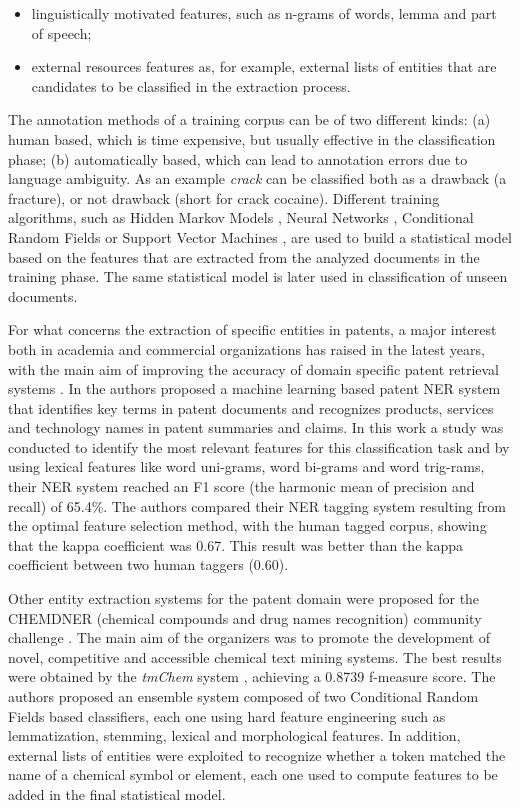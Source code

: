 \documentclass[]{book}
\providecommand{\tightlist}{%
  \setlength{\itemsep}{0pt}\setlength{\parskip}{0pt}}
\theoremstyle{definition}
\theoremstyle{definition}
\theoremstyle{definition}
\theoremstyle{remark}
\begin{document}
\begin{itemize}
\tightlist
\item
  linguistically motivated features, such as n-grams of words, lemma and
  part of speech;
\item
  external resources features as, for example, external lists of
  entities that are candidates to be classified in the extraction
  process.
\end{itemize}

The annotation methods of a training corpus can be of two different
kinds: (a) human based, which is time expensive, but usually effective
in the classification phase; (b) automatically based, which can lead to
annotation errors due to language ambiguity. As an example \emph{crack}
can be classified both as a drawback (a fracture), or not drawback
(short for crack cocaine). Different training algorithms, such as Hidden
Markov Models \citep{hmm}, Neural Networks \citep{nnet}, Conditional
Random Fields \citep{crf} or Support Vector Machines \citep{svm}, are
used to build a statistical model based on the features that are
extracted from the analyzed documents in the training phase. The same
statistical model is later used in classification of unseen documents.

For what concerns the extraction of specific entities in patents, a
major interest both in academia and commercial organizations has raised
in the latest years, with the main aim of improving the accuracy of
domain specific patent retrieval systems \citep{chemdner}. In
\citep{lee-ner13} the authors proposed a machine learning based patent
NER system that identifies key terms in patent documents and recognizes
products, services and technology names in patent summaries and claims.
In this work a study was conducted to identify the most relevant
features for this classification task and by using lexical features like
word uni-grams, word bi-grams and word trig-rams, their NER system
reached an F1 score (the harmonic mean of precision and recall) of
65.4\%. The authors compared their NER tagging system resulting from the
optimal feature selection method, with the human tagged corpus, showing
that the kappa coefficient was 0.67. This result was better than the
kappa coefficient between two human taggers (0.60).

Other entity extraction systems for the patent domain were proposed for
the CHEMDNER (chemical compounds and drug names recognition) community
challenge \citep{chemdner}. The main aim of the organizers was to
promote the development of novel, competitive and accessible chemical
text mining systems. The best results were obtained by the \emph{tmChem}
system \citep{leaman2015}, achieving a 0.8739 f-measure score. The
authors proposed an ensemble system composed of two Conditional Random
Fields based classifiers, each one using hard feature engineering such
as lemmatization, stemming, lexical and morphological features. In
addition, external lists of entities were exploited to recognize whether
a token matched the name of a chemical symbol or element, each one used
to compute features to be added in the final statistical model.
\end{document}
